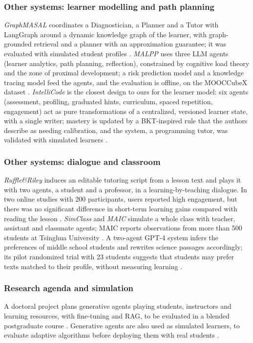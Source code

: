 \subsubsection{Other systems: learner modelling and path planning}
\emph{GraphMASAL}
coordinates a Diagnostician, a Planner and a Tutor with LangGraph around a
dynamic knowledge graph of the learner, with graph-grounded retrieval and a
planner with an approximation guarantee; it was evaluated with simulated
student profiles \cite{zeng2025graphmasal}. \emph{MALPP} uses three LLM
agents (learner analytics, path planning, reflection), constrained by
cognitive load theory and the zone of proximal development; a risk
prediction model and a knowledge tracing model feed the agents, and the
evaluation is offline, on the MOOCCubeX dataset \cite{xu2026malpp}.
\emph{IntelliCode} is the closest design to ours for the learner model:
six agents (assessment, profiling, graduated hints, curriculum, spaced
repetition, engagement) act as pure transformations of a centralized,
versioned learner state, with a single writer; mastery is updated by a
BKT-inspired rule that the authors describe as needing calibration, and
the system, a programming tutor, was validated with simulated learners
\cite{david2025intellicode}.

\subsubsection{Other systems: dialogue and classroom}
\emph{Ruffle\&Riley} induces an
editable tutoring script from a lesson text and plays it with two agents,
a student and a professor, in a learning-by-teaching dialogue. In two
online studies with 200 participants, users reported high engagement, but
there was no significant difference in short-term learning gains compared
with reading the lesson \cite{schmucker2024ruffle}. \emph{SimClass} and
\emph{MAIC} simulate a whole class with teacher, assistant and classmate
agents; MAIC reports observations from more than 500 students at Tsinghua
University \cite{zhang2025simclass,yu2024maic}. A two-agent GPT-4 system
infers the preferences of middle school students and rewrites science
passages accordingly; its pilot randomized trial with 23 students suggests
that students may prefer texts matched to their profile, without measuring
learning \cite{vaccaro2025stem}.

\subsubsection{Research agenda and simulation}
A doctoral project plans
generative agents playing students, instructors and learning resources,
with fine-tuning and RAG, to be evaluated in a blended postgraduate course
\cite{matilla2025lasi}. Generative agents are also used as simulated
learners, to evaluate adaptive algorithms before deploying them with real
students \cite{gao2025agent4edu,kaser2024}.

